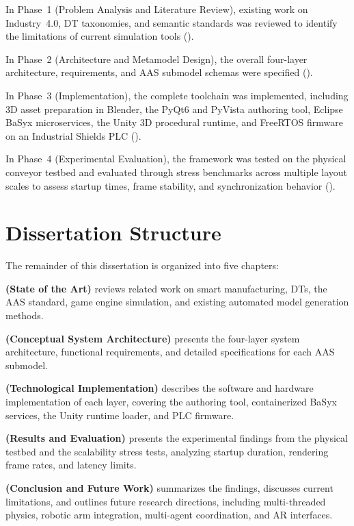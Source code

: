 In Phase~1 (Problem Analysis and Literature Review), existing work on Industry~4.0, \gls{DT} taxonomies, and semantic standards was reviewed to identify the limitations of current simulation tools ().

In Phase~2 (Architecture and Metamodel Design), the overall four-layer architecture, requirements, and \gls{AAS} submodel schemas were specified ().

In Phase~3 (Implementation), the complete toolchain was implemented, including 3D asset preparation in Blender, the PyQt6 and PyVista authoring tool, Eclipse BaSyx microservices, the Unity 3D procedural runtime, and FreeRTOS firmware on an Industrial Shields \gls{PLC} ().

In Phase~4 (Experimental Evaluation), the framework was tested on the physical conveyor testbed and evaluated through stress benchmarks across multiple layout scales to assess startup times, frame stability, and synchronization behavior ().

\section{Dissertation Structure}
\label{sec:structure}

The remainder of this dissertation is organized into five chapters:

\textbf{ (State of the Art)} reviews related work on smart manufacturing, \glspl{DT}, the \gls{AAS} standard, game engine simulation, and existing automated model generation methods.

\textbf{ (Conceptual System Architecture)} presents the four-layer system architecture, functional requirements, and detailed specifications for each \gls{AAS} submodel.

\textbf{ (Technological Implementation)} describes the software and hardware implementation of each layer, covering the authoring tool, containerized BaSyx services, the Unity runtime loader, and \gls{PLC} firmware.

\textbf{ (Results and Evaluation)} presents the experimental findings from the physical testbed and the scalability stress tests, analyzing startup duration, rendering frame rates, and latency limits.

\textbf{ (Conclusion and Future Work)} summarizes the findings, discusses current limitations, and outlines future research directions, including multi-threaded physics, robotic arm integration, multi-agent coordination, and \gls{AR} interfaces.